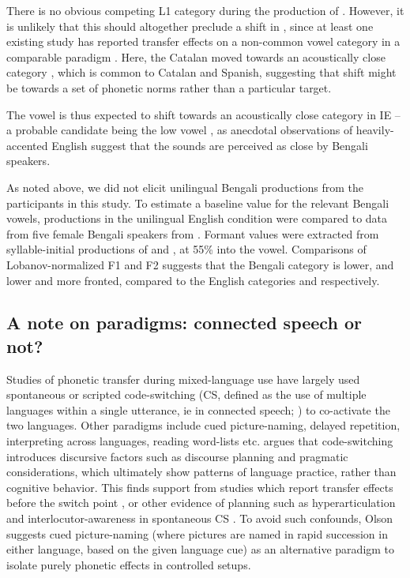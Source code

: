 \documentclass[charis,linguex]{glossa}
\newcommand{\nt}[1]{\textipa{[#1]}} %
\begin{document}

There is no obvious competing L1 category during the production of \nt{2}. However, it is unlikely that this should altogether preclude a shift in \nt{2}, since at least one existing study has reported transfer effects on a non-common vowel category in a comparable paradigm \citep{simonet2014phonetic}. Here, the Catalan \nt{O} moved towards an acoustically close category \nt{o}, which is common to Catalan and Spanish, suggesting that shift might be towards a set of phonetic norms rather than a particular target. 

The vowel \nt{2} is thus expected to shift towards an acoustically close category in IE -- a probable candidate being the low vowel \nt{a:}, as anecdotal observations of heavily-accented English suggest that the sounds are perceived as close by Bengali speakers. 

As noted above, we did not elicit unilingual Bengali productions from the participants in this study. To estimate a baseline value for the relevant Bengali vowels, productions in the unilingual English condition were compared to data from five female Bengali speakers from \cite{dutta2016using}. Formant values were extracted from syllable-initial productions of \nt{\ae} and \nt{a:}, at 55\% into the vowel. Comparisons of Lobanov-normalized F1 and F2 suggests that the Bengali category \nt{\ae} is lower, and \nt{a:} lower and more fronted, compared to the English categories \nt{\ae} and \nt{2} respectively. 

\subsection{A note on paradigms: connected speech or not?} \label{paradigms}

Studies of phonetic transfer during mixed-language use have largely used spontaneous or scripted code-switching (CS, defined as the use of multiple languages within a single utterance, ie in connected speech; \citealp{myers1993dueling}) to co-activate the two languages. Other paradigms include cued picture-naming, delayed repetition, interpreting across languages, reading word-lists etc. \cite{olson2013bilingual} argues that code-switching introduces discursive factors such as discourse planning and pragmatic considerations, which ultimately show patterns of language practice, rather than cognitive behavior. This finds support from studies which report transfer effects before the switch point \citep{bullock2009trying}, or other evidence of planning such as hyperarticulation \citep{muldner2019phonetics} and interlocutor-awareness in spontaneous CS \citep{khattab2013phonetic}. To avoid such confounds, Olson suggests cued picture-naming (where pictures are named in rapid succession in either language, based on the given language cue) as an alternative paradigm to isolate purely phonetic effects in controlled setups. 
\end{document}
